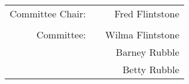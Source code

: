 \begin{tabular}{r c r}
 Committee Chair: & & Fred Flintstone\\
  &  & \\

 Committee: &   & Wilma Flintstone\\
 & & Barney Rubble\\
 & & Betty Rubble\\
\end{tabular}
